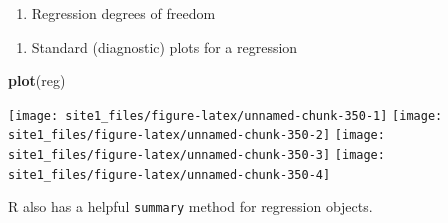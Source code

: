 \documentclass[]{book}
\newenvironment{Shaded}{\begin{snugshade}}{\end{snugshade}}
\newcommand{\KeywordTok}[1]{\textcolor[rgb]{0.13,0.29,0.53}{\textbf{#1}}}
\newcommand{\CommentTok}[1]{\textcolor[rgb]{0.56,0.35,0.01}{\textit{#1}}}
\newcommand{\OperatorTok}[1]{\textcolor[rgb]{0.81,0.36,0.00}{\textbf{#1}}}
\newcommand{\NormalTok}[1]{#1}
\providecommand{\tightlist}{%
  \setlength{\itemsep}{0pt}\setlength{\parskip}{0pt}}
\begin{document}
\begin{enumerate}
\def\labelenumi{\arabic{enumi}.}
\setcounter{enumi}{2}
\tightlist
\item
  Regression degrees of freedom
\end{enumerate}

\begin{Shaded}
\end{Shaded}

\begin{enumerate}
\def\labelenumi{\arabic{enumi}.}
\setcounter{enumi}{3}
\tightlist
\item
  Standard (diagnostic) plots for a regression
\end{enumerate}

\begin{Shaded}
\begin{Highlighting}[]
\KeywordTok{plot}\NormalTok{(reg)}
\end{Highlighting}
\end{Shaded}

\begin{center}\texttt{[image: site1\_files/figure-latex/unnamed-chunk-350-1]} \texttt{[image: site1\_files/figure-latex/unnamed-chunk-350-2]} \texttt{[image: site1\_files/figure-latex/unnamed-chunk-350-3]} \texttt{[image: site1\_files/figure-latex/unnamed-chunk-350-4]} \end{center}

R also has a helpful \texttt{summary} method for regression objects.
\end{document}
